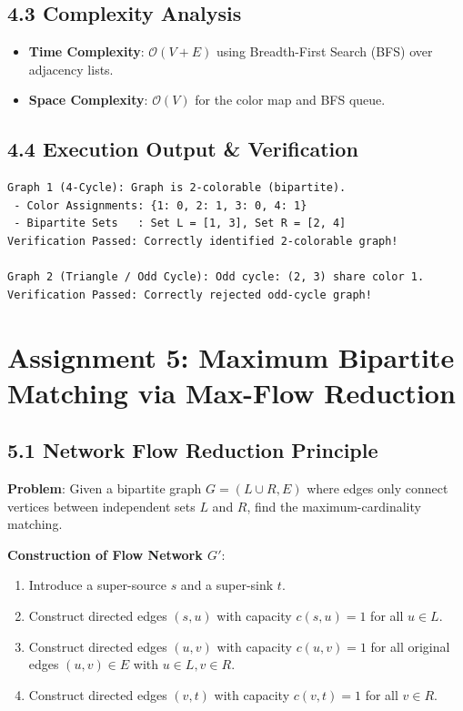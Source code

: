 \documentclass[12pt]{article}
\begin{document}
\subsection*{4.3 Complexity Analysis}
\begin{itemize}
    \item \textbf{Time Complexity}: $\mathcal{O}(V + E)$ using Breadth-First Search (BFS) over adjacency lists.
    \item \textbf{Space Complexity}: $\mathcal{O}(V)$ for the color map and BFS queue.
\end{itemize}

\subsection*{4.4 Execution Output \& Verification}
\begin{lstlisting}
Graph 1 (4-Cycle): Graph is 2-colorable (bipartite).
 - Color Assignments: {1: 0, 2: 1, 3: 0, 4: 1}
 - Bipartite Sets   : Set L = [1, 3], Set R = [2, 4]
Verification Passed: Correctly identified 2-colorable graph!

Graph 2 (Triangle / Odd Cycle): Odd cycle: (2, 3) share color 1.
Verification Passed: Correctly rejected odd-cycle graph!
\end{lstlisting}

\newpage

\section*{Assignment 5: Maximum Bipartite Matching via Max-Flow Reduction}

\subsection*{5.1 Network Flow Reduction Principle}
\textbf{Problem}: Given a bipartite graph $G = (L \cup R, E)$ where edges only connect vertices between independent sets $L$ and $R$, find the maximum-cardinality matching.

\textbf{Construction of Flow Network $G'$}:
\begin{enumerate}
    \item Introduce a super-source $s$ and a super-sink $t$.
    \item Construct directed edges $(s, u)$ with capacity $c(s, u) = 1$ for all $u \in L$.
    \item Construct directed edges $(u, v)$ with capacity $c(u, v) = 1$ for all original edges $(u, v) \in E$ with $u \in L, v \in R$.
    \item Construct directed edges $(v, t)$ with capacity $c(v, t) = 1$ for all $v \in R$.
\end{enumerate}
\end{document}
